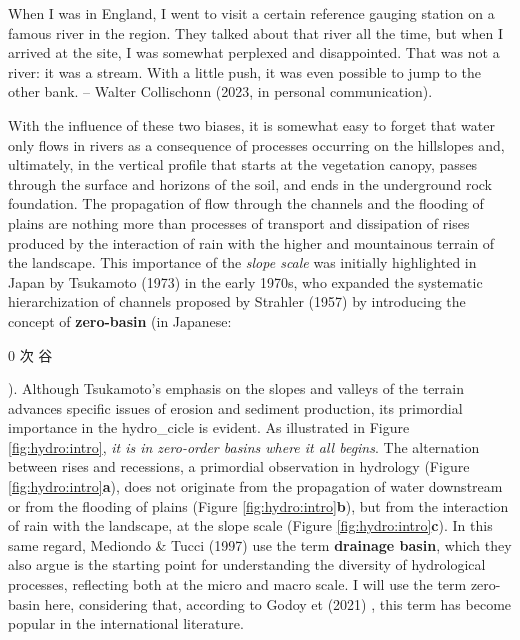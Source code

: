 \documentclass[./main_en.tex]{subfiles}
\begin{document}
\begin{adjustwidth}{100pt}{0pt}
\medskip
\small When I was in England, I went to visit a certain reference gauging station on a famous river in the region. They talked about that river all the time, but when I arrived at the site, I was somewhat perplexed and disappointed. That was not a river: it was a stream. With a little push, it was even possible to jump to the other bank. -- Walter Collischonn (2023, in personal communication).
\medskip
\end{adjustwidth}

\noindent With the influence of these two biases, it is somewhat easy to forget that water only flows in rivers as a consequence of processes occurring on the hillslopes and, ultimately, in the vertical profile that starts at the vegetation canopy, passes through the surface and horizons of the soil, and ends in the underground rock foundation. The propagation of flow through the channels and the flooding of plains are nothing more than processes of transport and dissipation of rises produced by the interaction of rain with the higher and mountainous terrain of the landscape. This importance of the \textit{slope scale} was initially highlighted in Japan by Tsukamoto (1973) \cite{tsukamoto1973} in the early 1970s, who expanded the systematic hierarchization of channels proposed by Strahler (1957) \cite{strahler1957} by introducing the concept of \textbf{\gls{zero-basin}} (in Japanese: \begin{CJK}{UTF8}{min}0 次 谷\end{CJK}). Although Tsukamoto's emphasis on the slopes and valleys of the terrain advances specific issues of erosion and sediment production, its primordial importance in the \gls{hydro_cicle} is evident. As illustrated in Figure \ref{fig:hydro:intro}, \textit{it is in zero-order basins where it all begins}. The alternation between rises and recessions, a primordial observation in \gls{hydrology} (Figure \ref{fig:hydro:intro}\textbf{a}), does not originate from the propagation of water downstream or from the flooding of plains (Figure \ref{fig:hydro:intro}\textbf{b}), but from the interaction of rain with the landscape, at the slope scale (Figure \ref{fig:hydro:intro}\textbf{c}). In this same regard, Mediondo \& Tucci (1997) \cite{mediondo1997} use the term \textbf{drainage basin}, which they also argue is the starting point for understanding the diversity of hydrological processes, reflecting both at the micro and macro scale. I will use the term \gls{zero-basin} here, considering that, according to Godoy et  (2021) \cite{godoy2021}, this term has become popular in the international literature.
\end{document}
